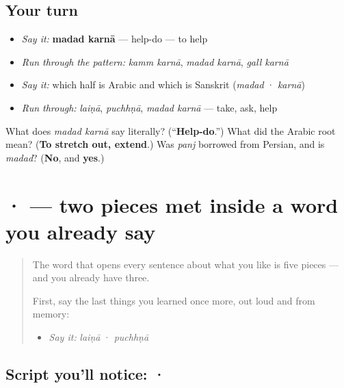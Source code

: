 \subsection*{Your turn}
\begin{itemize}
\raggedright
  \item \emph{Say it:} \textbf{madad karnā} — help-do — to help
  \item \emph{Run through the pattern:} \emph{kamm karnā}, \emph{madad karnā}, \emph{gall karnā}
  \item \emph{Say it:} which half is Arabic and which is Sanskrit (\emph{madad} · \emph{karnā})
  \item \emph{Run through:} \emph{laiṇā}, \emph{puchhṇā}, \emph{madad karnā} — take, ask, help
\end{itemize}

\begin{tcolorbox}[breakable,colback=teal!4,colframe=teal!35!black,title={Before you move on}]
What does \emph{madad karnā} say literally? (“\textbf{Help-do}.”) What did the Arabic root mean? (\textbf{To stretch out, extend}.) Was \emph{panj} borrowed from Persian, and is \emph{madad}? (\textbf{No}, and \textbf{yes}.)
\end{tcolorbox}
\section[\texorpdfstring{\pa{ੂ} · \pa{ਉ} (-ū · u)}{ੂ · ਉ (-ū · u)}]{ ·  — two pieces met inside a word you already say}

\label{lesson:PA-S09-dulainkar-oora}



\begin{quote}
The word that opens every sentence about what you like is five pieces — and you already have three.

First, say the last things you learned once more, out loud and from memory:

\begin{itemize}
\raggedright
  \item \emph{Say it:} \emph{laiṇā} · \emph{puchhṇā}
\end{itemize}
\end{quote}

\subsection*{Script you'll notice:  · }
\begin{quote}
\end{quote}

